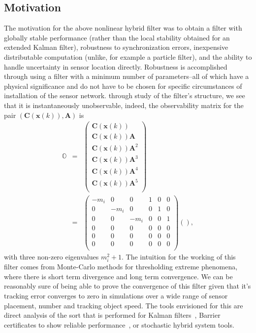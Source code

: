 \subsection{Motivation}
The motivation for the above nonlinear hybrid filter was to obtain a filter with globally stable performance (rather than the local stability obtained for an extended Kalman filter), robustness to synchronization errors, inexpensive distributable computation (unlike, for example a particle filter), and the ability to handle uncertainty in sensor location directly. Robustness is accomplished through using a filter with a minimum number of parameters--all of which have a physical significance and do not have to be chosen for specific circumstances of installation of the sensor network. through study of the filter's structure, we see that it is instantaneously unobservable, indeed, the observability matrix for the pair $\left(\mathbf{C}\left(\mathbf{x}(k)\right),\mathbf{A}\right)$ is
\begin{eqnarray}
    \mathbb{O}&=&\left(\begin{array}{c}\mathbf{C}\left(\mathbf{x}(k)\right)\\
    \mathbf{C}\left(\mathbf{x}(k)\right)\mathbf{A}\\
    \mathbf{C}\left(\mathbf{x}(k)\right)\mathbf{A}^2\\
    \mathbf{C}\left(\mathbf{x}(k)\right)\mathbf{A}^3\\
    \mathbf{C}\left(\mathbf{x}(k)\right)\mathbf{A}^4\\
    \mathbf{C}\left(\mathbf{x}(k)\right)\mathbf{A}^5\\
    \end{array}\right)\label{eqn:obsvmatrix}\\
    &=&\begin{pmatrix}
         -m_i & 0 & 0 & 1 & 0 & 0 \\
         0 & -m_i & 0 & 0 & 1 & 0 \\
         0 & 0 & -m_i & 0 & 0 & 1 \\
         0 & 0 & 0 & 0 & 0 & 0 \\
         0 & 0 & 0 & 0 & 0 & 0 \\
         0 & 0 & 0 & 0 & 0 & 0 \\
       \end{pmatrix}
    \left(\right)\label{eqn:obsveig},
\end{eqnarray}
with three non-zero eigenvalues $m_i^2+1$. The intuition for the working of this filter comes from Monte-Carlo methods for thresholding extreme phenomena, where there is short term divergence and long term convergence. We can be reasonably sure of being able to prove the convergence of this filter given that it's tracking error converges to zero in simulations over a wide range of sensor placement, number and tracking object speed. The tools envisioned for this are direct analysis of the sort that is performed for Kalman filters~\cite{SOLO,BOUGEROL}, Barrier certificates to show reliable performance~\cite{PRAJ,GLA}, or stochastic hybrid system tools.

